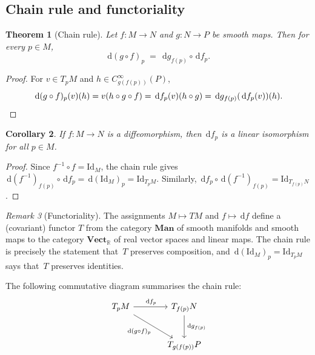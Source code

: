 \documentclass[12pt,a4paper,openany]{book}
\newtheorem{theorem}{Theorem}[section]
\newtheorem{corollary}[theorem]{Corollary}
\theoremstyle{definition}
\theoremstyle{remark}
\newtheorem{remark}[theorem]{Remark}
\newcommand{\R}{\mathbb{R}}
\newcommand{\Id}{\mathrm{Id}}
\newcommand{\dd}{\,\mathrm{d}}
\begin{document}
\subsection{Chain rule and functoriality}\label{ssec:chain-rule}

\begin{theorem}[Chain rule]\label{thm:chain-rule}%
Let $f \colon M \to N$ and $g \colon N \to P$ be smooth maps.  Then for
every $p \in M$,
\[
  \dd(g \circ f)_p \;=\; \dd g_{f(p)} \circ \dd f_p.
\]
\end{theorem}

\begin{proof}
For $v \in T_pM$ and $h \in C^\infty_{g(f(p))}(P)$,
\[
  \dd(g \circ f)_p(v)(h)
  = v(h \circ g \circ f)
  = \dd f_p(v)(h \circ g)
  = \dd g_{f(p)}(\dd f_p(v))(h).
  \qedhere
\]
\end{proof}

\begin{corollary}\label{cor:diffeo-iso}%
If $f \colon M \to N$ is a diffeomorphism, then $\dd f_p$ is a linear
isomorphism for all $p \in M$.
\end{corollary}

\begin{proof}
Since $f^{-1} \circ f = \Id_M$, the chain rule gives
$\dd(f^{-1})_{f(p)} \circ \dd f_p = \dd(\Id_M)_p = \Id_{T_pM}$.
Similarly, $\dd f_p \circ \dd(f^{-1})_{f(p)} = \Id_{T_{f(p)}N}$.
\end{proof}

\begin{remark}[Functoriality]\label{rem:functoriality}%
The assignments $M \mapsto TM$ and $f \mapsto \dd f$ define a (covariant)
functor $T$ from the category $\mathbf{Man}$ of smooth manifolds and
smooth maps to the category $\mathbf{Vect}_\R$ of real vector spaces
and linear maps.  The chain rule is precisely the statement that~$T$
preserves composition, and $\dd(\Id_M)_p = \Id_{T_pM}$ says that~$T$
preserves identities.
\end{remark}

The following commutative diagram summarises the chain rule:
\[
\begin{tikzcd}[column sep=large, row sep=large]
  T_pM \arrow[r, "\dd f_p"] \arrow[dr, "\dd(g \circ f)_p"'] &
  T_{f(p)}N \arrow[d, "\dd g_{f(p)}"] \\
  & T_{g(f(p))}P
\end{tikzcd}
\]
\end{document}
